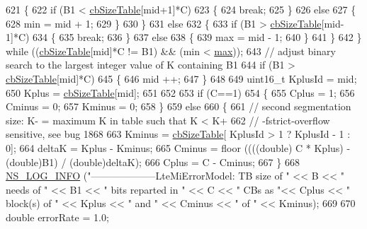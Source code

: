 \begin{DoxyCode}
621         \{
622           \textcolor{keywordflow}{if} (B1 < \hyperlink{namespacens3_a14a1917c5d5a089d32d5d29e3c380ab9}{cbSizeTable}[mid+1]*C)
623             \{
624               \textcolor{keywordflow}{break};
625             \}
626           \textcolor{keywordflow}{else}
627             \{
628               min = mid + 1;
629             \}
630         \}
631       \textcolor{keywordflow}{else}
632         \{
633           \textcolor{keywordflow}{if} (B1 > \hyperlink{namespacens3_a14a1917c5d5a089d32d5d29e3c380ab9}{cbSizeTable}[mid-1]*C)
634             \{
635               \textcolor{keywordflow}{break};
636             \}
637           \textcolor{keywordflow}{else}
638             \{
639               max = mid - 1;
640             \}
641         \}
642   \} \textcolor{keywordflow}{while} ((\hyperlink{namespacens3_a14a1917c5d5a089d32d5d29e3c380ab9}{cbSizeTable}[mid]*C != B1) && (min < \hyperlink{80211b_8c_affe776513b24d84b39af8ab0930fef7f}{max}));
643   \textcolor{comment}{// adjust binary search to the largest integer value of K containing B1}
644   \textcolor{keywordflow}{if} (B1 > \hyperlink{namespacens3_a14a1917c5d5a089d32d5d29e3c380ab9}{cbSizeTable}[mid]*C)
645     \{
646       mid ++;
647     \}
648 
649   uint16\_t KplusId = mid;
650   Kplus = \hyperlink{namespacens3_a14a1917c5d5a089d32d5d29e3c380ab9}{cbSizeTable}[mid];
651 
652 
653   \textcolor{keywordflow}{if} (C==1)
654     \{
655       Cplus = 1;
656       Cminus = 0;
657       Kminus = 0;
658     \}
659   \textcolor{keywordflow}{else}
660     \{
661       \textcolor{comment}{// second segmentation size: K- = maximum K in table such that K < K+}
662       \textcolor{comment}{// -fstrict-overflow sensitive, see bug 1868}
663       Kminus = \hyperlink{namespacens3_a14a1917c5d5a089d32d5d29e3c380ab9}{cbSizeTable}[ KplusId > 1 ? KplusId - 1 : 0];
664       deltaK = Kplus - Kminus;
665       Cminus = floor ((((\textcolor{keywordtype}{double}) C * Kplus) - (\textcolor{keywordtype}{double})B1) / (\textcolor{keywordtype}{double})deltaK);
666       Cplus = C - Cminus;
667     \}
668   \hyperlink{group__logging_gafbd73ee2cf9f26b319f49086d8e860fb}{NS\_LOG\_INFO} (\textcolor{stringliteral}{"--------------------LteMiErrorModel: TB size of "} << B << \textcolor{stringliteral}{" needs of "} << B1 << \textcolor{stringliteral}{
      " bits reparted in "} << C << \textcolor{stringliteral}{" CBs as "}<< Cplus << \textcolor{stringliteral}{" block(s) of "} << Kplus << \textcolor{stringliteral}{" and "} << Cminus << \textcolor{stringliteral}{" of "} 
      << Kminus);
669 
670   \textcolor{keywordtype}{double} errorRate = 1.0;

\end{DoxyCode}
